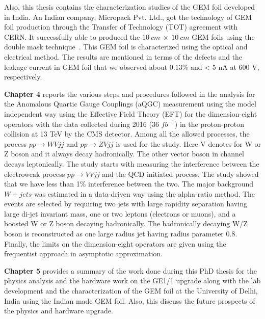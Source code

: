 Also, this thesis contains the characterization studies of the GEM foil developed in India. An Indian company, Micropack Pvt. Ltd., got the technology of GEM foil production through the Transfer of Technology (TOT) agreement with CERN. It successfully able to produced the $10~cm~\times~10~cm$ GEM foils using the double mask technique~\cite{DEOLIVEIRA2009}. This GEM foil is characterized using the optical and electrical method. The results are mentioned in terms of the defects and the leakage current in GEM foil that we observed about $0.13\%$ and < 5 nA at 600 V, respectively.


\textbf{Chapter 4} reports the various steps and procedures followed in the analysis for the Anomalous Quartic Gauge Couplings (aQGC) measurement using the model independent way using the Effective Field Theory (EFT) for the dimension-eight operators with the data collected during 2016 (36 $fb^{-1}$) in the proton-proton collision at 13 TeV by the CMS detector. Among all the allowed processes, the process $pp \rightarrow WV jj$ and $pp \rightarrow ZV jj$ is used for the study. Here V denotes for W or Z boson and it always decay hadronically. The other vector boson in channel decays leptonically. The study starts with measuring the interference between the electroweak process $pp \rightarrow VV jj$ and the QCD initiated process. The study showed that we have less than 1\% interference between the two. The major background $W+jets$ was estimated in a data-driven way using the alpha-ratio method. The events are selected by requiring two jets with large rapidity separation having large di-jet invariant mass, one or two leptons (electrons or muons), and a boosted W or Z boson decaying hadronically. The hadronically decaying W/Z boson is reconstructed as one large radius jet having radius parameter 0.8. Finally, the limits on the dimension-eight operators are given using the frequentist approach in asymptotic approximation.


\textbf{Chapter 5} provides a summary of the work done during this PhD thesis for the physics analysis and the hardware work on the GE1/1 upgrade along with the lab development and the characterization of the GEM foil at the University of Delhi, India using the Indian made GEM foil. Also, this discuss the future prospects of the physics and hardware upgrade.

